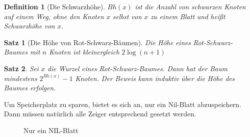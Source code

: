 \documentclass[ngerman,draft,parskip=half*,twoside]{scrreprt}
\theoremstyle{break}
\newtheorem{definition}{Definition}
\newtheorem{satz}{Satz}
\begin{document}
\begin{definition}[Die Schwarzhöhe]
  $Bh(x)$ ist die Anzahl von schwarzen Knoten auf einem Weg, ohne den Knoten $x$  selbst von $x$ zu einem Blatt und heißt
  Schwarzhöhe von $x$.
\end{definition}

\begin{satz}[Die Höhe von Rot-Schwarz-Bäumen] \label{rshoehe}
  Die Höhe eines Rot-Schwarz-Baumes mit $n$ Knoten ist kleinergleich $2\log(n+1)$
\end{satz}
  
\begin{satz} \label{schwarzhoehe}
Sei $x$ die Wurzel eines Rot-Schwarz-Baumes. Dann hat der Baum mindestens $2^{Bh(x)}-1$ Knoten.
  Der Beweis kann induktiv über die Höhe des Baumes erfolgen.
\end{satz}

Um Speicherplatz zu sparen, bietet es sich an, nur ein Nil-Blatt abzuspeichern. Dann müssen natürlich alle Zeiger entsprechend gesetzt
werden.
 
 \begin{figure}[H]
    \centering
    \caption{Nur ein NIL-Blatt}
    \label{241103c}
 \end{figure}
\end{document}
